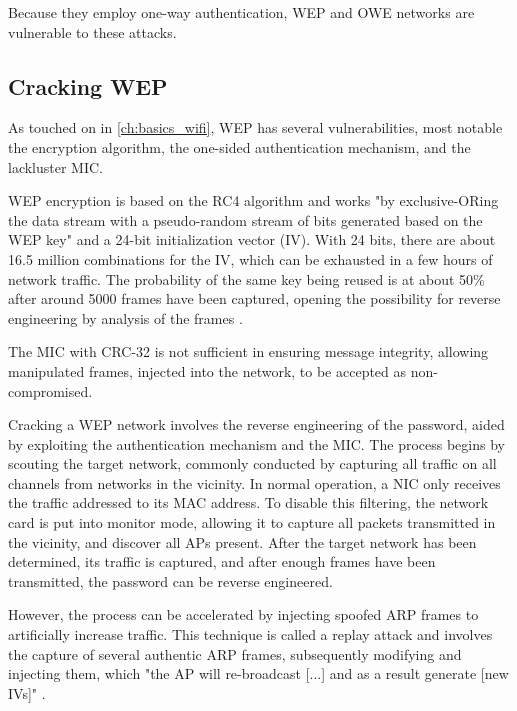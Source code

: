 Because they employ one-way authentication, WEP and OWE networks are vulnerable to these attacks. \cite[page~105,119]{Sankaran_Gulasekaran_2021} 

\subsection{Cracking WEP}
As touched on in \cref{ch:basics_wifi}, WEP has several vulnerabilities, most notable the encryption algorithm, the one-sided authentication mechanism, and the lackluster MIC.

WEP encryption is based on the RC4 algorithm and works "by exclusive-ORing the data stream with a pseudo-random stream of bits generated based on the WEP key" \cite[page~104]{Sankaran_Gulasekaran_2021} and a 24-bit initialization vector (IV).
With 24 bits, there are about 16.5 million combinations for the IV, which can be exhausted in a few hours of network traffic.
The probability of the same key being reused is at about 50\% after around 5000 frames have been captured, opening the possibility for reverse engineering by analysis of the frames \cite{Oriyano_2017}.

The MIC with CRC-32 is not sufficient in ensuring message integrity, allowing manipulated frames, injected into the network, to be accepted as non-compromised. \cite{Oriyano_2017}


Cracking a WEP network involves the reverse engineering of the password, aided by exploiting the authentication mechanism and the MIC.
The process begins by scouting the target network, commonly conducted by capturing all traffic on all channels from networks in the vicinity.
In normal operation, a NIC only receives the traffic addressed to its MAC address.
To disable this filtering, the network card is put into monitor mode, allowing it to capture all packets transmitted in the vicinity, and discover all APs present.
After the target network has been determined, its traffic is captured, and after enough frames have been transmitted, the password can be reverse engineered.

However, the process can be accelerated by injecting spoofed ARP frames to artificially increase traffic.
This technique is called a replay attack and involves the capture of several authentic ARP frames, subsequently modifying and injecting them, which "the AP will re-broadcast [...] and as a result generate [new IVs]" \cite{Oriyano_2017}.

